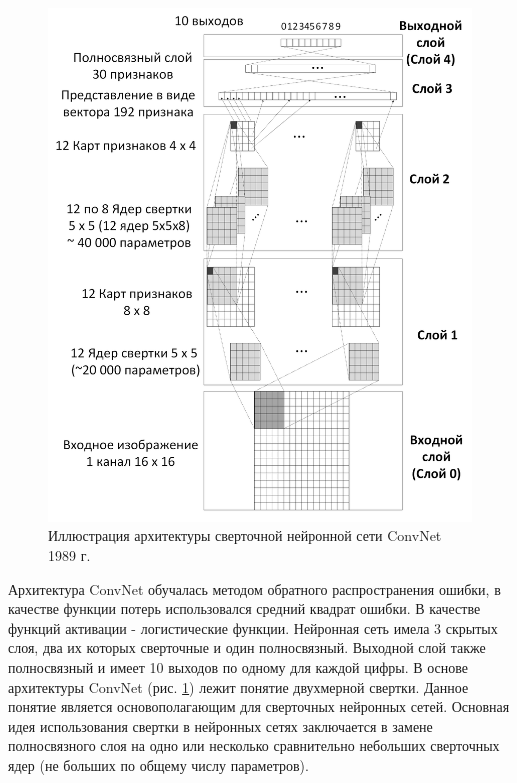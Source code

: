 \documentclass[12pt]{article}
\begin{document}
\begin{sloppypar}
\begin{figure}[!h]
	\begin{center}
		\includegraphics[width=0.99\linewidth]{./figuresch1/convnet1989_v2.png}
		\caption{Иллюстрация архитектуры сверточной нейронной сети ConvNet 1989 г.}		
		\label{ch1:fig:convnet1989}
	\end{center}
\end{figure}
Архитектура ConvNet обучалась методом обратного распространения ошибки, в качестве функции потерь использовался средний квадрат ошибки. В качестве функций активации - логистические функции. Нейронная сеть имела 3 скрытых слоя, два их которых сверточные и один полносвязный. Выходной слой также полносвязный и имеет 10 выходов по одному для каждой цифры. 
В основе архитектуры ConvNet (рис. \ref{ch1:fig:convnet1989}) лежит понятие двухмерной свертки. Данное понятие является основополагающим для сверточных нейронных сетей. Основная идея использования свертки в нейронных сетях заключается в замене полносвязного слоя на одно или несколько сравнительно небольших сверточных ядер (не больших по общему числу параметров). 


\end{sloppypar}
\end{document}
